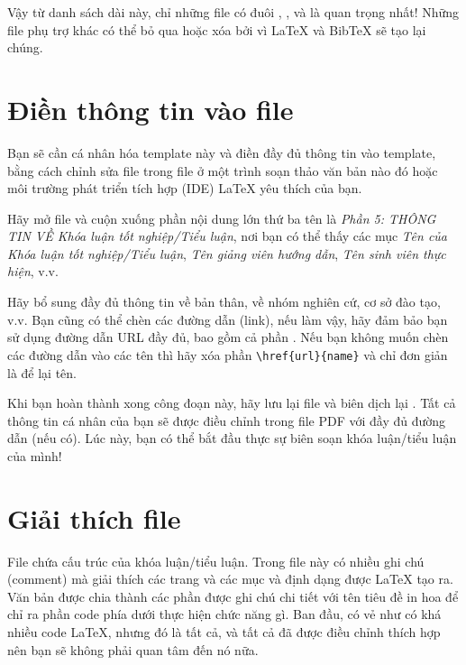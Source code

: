 Vậy từ danh sách dài này, chỉ những file có đuôi , ,  và  là quan trọng nhất! Những file phụ trợ khác có thể bỏ qua hoặc xóa bởi vì \LaTeX{} và BibTeX sẽ tạo lại chúng.



\section{Điền thông tin vào file }\label{FillingFile}

Bạn sẽ cần cá nhân hóa template này và điền đầy đủ thông tin vào template, bằng cách chỉnh sửa file  trong file ở một trình soạn thảo văn bản nào đó hoặc môi trường phát triển tích hợp (IDE) \LaTeX{} yêu thích của bạn.

Hãy mở file  và cuộn xuống phần nội dung lớn thứ ba tên là \emph{Phần 5: THÔNG TIN VỀ Khóa luận tốt nghiệp/Tiểu luận}, nơi bạn có thể thấy các mục \emph{Tên của Khóa luận tốt nghiệp/Tiểu luận}, \emph{Tên giảng viên hướng dẫn}, \emph{Tên sinh viên thực hiện}, v.v.

Hãy bổ sung đầy đủ thông tin về bản thân, về nhóm nghiên cứ, cơ sở đào tạo, v.v. Bạn cũng có thể chèn các đường dẫn (link), nếu làm vậy, hãy đảm bảo bạn sử dụng đường dẫn URL đầy đủ, bao gồm cả phần . Nếu bạn không muốn chèn các đường dẫn vào các tên thì hãy xóa phần \verb|\href{url}{name}| và chỉ đơn giản là để lại tên.

Khi bạn hoàn thành xong công đoạn này, hãy lưu lại file và biên dịch lại . Tất cả thông tin cá nhân của bạn sẽ được điều chỉnh trong file PDF với đầy đủ đường dẫn (nếu có). Lúc này, bạn có thể bắt đầu thực sự biên soạn khóa luận/tiểu luận của mình!



\section{Giải thích file }

File  chứa cấu trúc của khóa luận/tiểu luận. Trong file này có nhiều ghi chú (comment) mà giải thích các trang và các mục và định dạng được \LaTeX{} tạo ra. Văn bản được chia thành các phần được ghi chú chi tiết với tên tiêu đề in hoa để chỉ ra phần code phía dưới thực hiện chức năng gì. Ban đầu, có vẻ như có khá nhiều code \LaTeX{}, nhưng đó là tất cả, và tất cả đã được điều chỉnh thích hợp nên bạn sẽ không phải quan tâm đến nó nữa.

